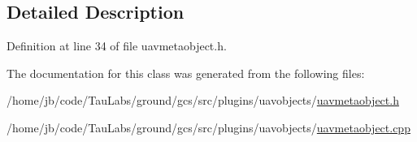 \subsection{\-Detailed \-Description}


\-Definition at line 34 of file uavmetaobject.\-h.



\-The documentation for this class was generated from the following files\-:\begin{DoxyCompactItemize}
\item 
/home/jb/code/\-Tau\-Labs/ground/gcs/src/plugins/uavobjects/\hyperlink{uavmetaobject_8h}{uavmetaobject.\-h}\item 
/home/jb/code/\-Tau\-Labs/ground/gcs/src/plugins/uavobjects/\hyperlink{uavmetaobject_8cpp}{uavmetaobject.\-cpp}\end{DoxyCompactItemize}
